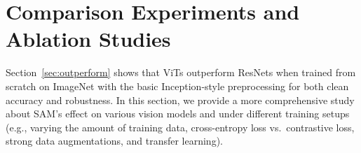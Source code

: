 \documentclass{article}
\newcommand{\XC}[1]{\textcolor{red}{Xiangning: #1}}
\begin{document}






\section{Comparison Experiments and Ablation Studies}
Section~\ref{sec:outperform} shows that ViTs outperform ResNets when trained from scratch on ImageNet with the basic Inception-style preprocessing for both clean accuracy and robustness.
In this section, we provide a more comprehensive study about SAM's effect on various vision models and under different training setups (e.g., varying the amount of training data, cross-entropy loss vs.\ contrastive loss, strong data augmentations, and transfer learning). 




\end{document}
